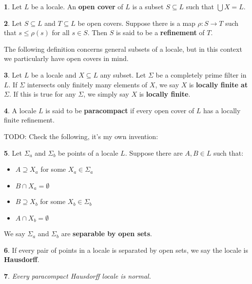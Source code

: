 \documentclass[oneside,english]{amsbook}
\numberwithin{section}{chapter}
\theoremstyle{plain}
\newtheorem{thm}{\protect\theoremname}
\theoremstyle{definition}
\newtheorem{defn}[thm]{\protect\definitionname}
\providecommand{\definitionname}{Definition}
\providecommand{\theoremname}{Theorem}
\begin{document}
\begin{defn}
	Let $L$ be a locale. An \textbf{open cover} of $L$ is a subset $S\subseteq L$ such that $\bigcup X = L$.
\end{defn}

\begin{defn}
	Let $S\subseteq L$ and $T\subseteq L$ be open covers. Suppose there is a map $\rho:S\to T$ such that $s\le \rho(s)$ for all $s\in S$. Then $S$ is said to be a \textbf{refinement} of $T$.
\end{defn}

The following definition concerns general subsets of a locale, but in this context we particularly have open covers in mind.

\begin{defn}
	Let $L$ be a locale and $X\subseteq L$ any subset. Let $\Sigma$ be a completely prime filter in $L$. If $\Sigma$ intersects only finitely many elements of $X$, we say $X$ is \textbf{locally finite at $\Sigma$}. If this is true for any $\Sigma$, we simply say $X$ is \textbf{locally finite}.
\end{defn}

\begin{defn}A locale $L$ is said to be \textbf{paracompact} if every open cover of $L$ has a locally finite refinement.
\end{defn}

TODO: Check the following, it's my own invention:

\begin{defn}Let $\Sigma_a$ and $\Sigma_b$ be points of a locale $L$. Suppose there are $A, B\in L$ such that:
	\begin{itemize}
		\item{$A \supseteq X_a$ for some $X_a\in \Sigma_a$}
		\item{$B \cap X_a = \emptyset$}
		\item{$B \supseteq X_b$ for some $X_b\in \Sigma_b$}
		\item{$A \cap X_b = \emptyset$}
	\end{itemize} 	
	We say $\Sigma_a$ and $\Sigma_b$ are \textbf{separable by open sets}.
\end{defn}

\begin{defn}
	If every pair of points in a locale is separated by open sets, we say the locale is \textbf{Hausdorff}.
\end{defn}

\begin{thm}
	Every paracompact Hausdorff locale is normal.
\end{thm}
\end{document}
